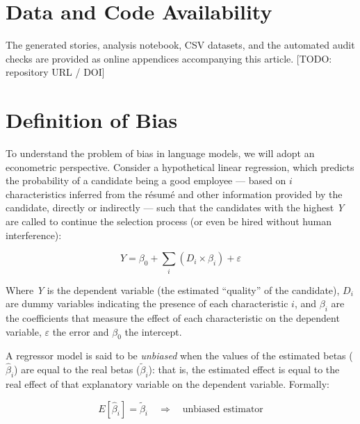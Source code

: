 \documentclass[jair,11pt,letterpaper]{article}
\begin{document}
\section*{Data and Code Availability}
The generated stories, analysis notebook, CSV datasets, and the automated audit
checks are provided as online appendices accompanying this article.
[TODO: repository URL / DOI]


\clearpage
\appendix
\section{Definition of Bias}\label{app:bias}




To understand the problem of bias in language models, we will
adopt an econometric perspective. Consider a hypothetical linear
regression, which predicts the probability of a candidate being a good
employee --- based on $i$ characteristics inferred from the résumé
and other information provided by the candidate, directly or indirectly
--- such that the candidates with the highest \textit{Y} are called to continue
the selection process (or even be hired without human
interference):

\begin{equation}
Y = \beta_0 + \sum_i (D_i \times \beta_i) + \varepsilon
\end{equation}

Where \textit{Y} is the dependent variable (the estimated ``quality'' of the
candidate), $D_i$ are dummy variables indicating the presence of each
characteristic $i$, and $\beta_i$ are the coefficients that measure the effect of
each characteristic on the dependent variable, $\varepsilon$ the error and $\beta_0$ the
intercept.

A regressor model is said to be \textit{unbiased} when the values of the estimated betas
($\hat{\beta}_i$) are equal to the real betas ($\tilde{\beta}_i$): that is, the
estimated effect is equal to the real effect of that explanatory variable on the
dependent variable. Formally:

\begin{equation}
E[\hat{\beta}_i] = \tilde{\beta}_i \quad \Rightarrow \quad \text{unbiased estimator}
\end{equation}
\end{document}

